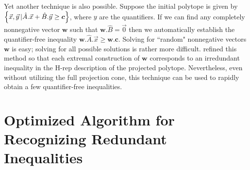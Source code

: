 
Yet another technique is also possible. Suppose the initial polytope is given by $\left\lbrace\vec{x},\vec{y}\,|\hat{A}.\vec{x}+\hat{B}.\vec{y}\geq\bm{c}\right\rbrace$, where $y$ are the quantifiers. If we can find any completely nonnegative vector $\bm{w}$ such that $\bm{w}.\hat{B}=\vec{0}$ then we automatically establish the quantifier-free inequality $\bm{w}.\hat{A}.\vec{x}\geq\bm{w}.\bm{c}$. Solving for ``random" nonnegative vectors $\bm{w}$ is easy; solving for all possible solutions is rather more difficult. \citet{BalasProjectionCone} refined this method so that each extremal construction of $\bm{w}$ corresponds to an irredundant inequality in the H-rep description of the projected polytope. Nevertheless, even without utilizing the full projection cone, this technique can be used to rapidly obtain a few quantifier-free inequalities. 

\section{Optimized Algorithm for Recognizing Redundant Inequalities}\label{sec:redundancy}


